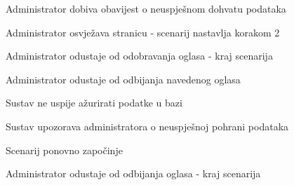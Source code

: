 \begin{packed_item}
\begin{packed_item}
\begin{packed_enum}
								\item Administrator dobiva obavijest o neuspješnom dohvatu podataka
								\item
									\begin{packed_enum}
										\item Administrator osvježava stranicu - scenarij nastavlja korakom 2
										\item Administrator odustaje od odobravanja oglasa - kraj scenarija
									\end{packed_enum}	
							\end{packed_enum}
							\item[5.a] Administrator odustaje od odbijanja navedenog oglasa
							\item[6.a] Sustav ne uspije ažurirati podatke u bazi
							\item[] \begin{packed_enum}
								\item Sustav upozorava administratora o neuspješnoj pohrani podataka 
								\item
									\begin{packed_enum}
										\item Scenarij ponovno započinje
										\item Administrator odustaje od odbijanja oglasa - kraj scenarija
									\end{packed_enum}
								\end{packed_enum}					
						\end{packed_item}
					\end{packed_item}

